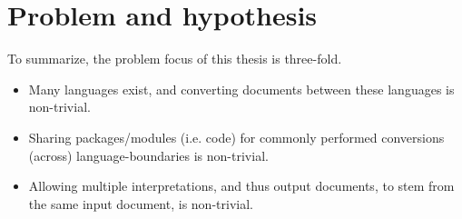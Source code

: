 \documentclass{scrreprt}
\begin{document}


























\chapter{Problem and hypothesis}
To summarize, the problem focus of this thesis is three-fold.

\begin{itemize}
\item Many languages exist, and converting documents between these languages is non-trivial.
\item Sharing packages/modules (i.e. code) for commonly performed conversions (across) language-boundaries is non-trivial.
\item Allowing multiple interpretations, and thus output documents, to stem from the same input document, is non-trivial.
\end{itemize}
\end{document}
